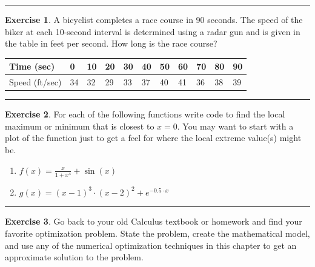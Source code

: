 \documentclass[
]{book}
\theoremstyle{definition}
\theoremstyle{definition}
\theoremstyle{definition}
\newtheorem{exercise}{Exercise}[chapter]
\theoremstyle{remark}
\begin{document}
\begin{center}\rule{0.5\linewidth}{0.5pt}\end{center}

\begin{exercise}
\protect\hypertarget{exr:unnamed-chunk-267}{}{\label{exr:unnamed-chunk-267} }A bicyclist completes a race course in 90 seconds. The speed of the
biker at each 10-second interval is determined using a radar gun and is
given in the table in feet per second. How long is the race course?

\begin{longtable}[]{@{}lllllllllll@{}}
\toprule
Time (sec) & 0 & 10 & 20 & 30 & 40 & 50 & 60 & 70 & 80 & 90\tabularnewline
\midrule
\endhead
Speed (ft/sec) & 34 & 32 & 29 & 33 & 37 & 40 & 41 & 36 & 38 & 39\tabularnewline
\bottomrule
\end{longtable}
\end{exercise}

\begin{center}\rule{0.5\linewidth}{0.5pt}\end{center}

\begin{exercise}
\protect\hypertarget{exr:unnamed-chunk-268}{}{\label{exr:unnamed-chunk-268} }For each of the following functions write code to find the local maximum
or minimum that is closest to \(x=0\). You may want to start with a plot
of the function just to get a feel for where the local extreme value(s)
might be.

\begin{enumerate}
\def\labelenumi{\alph{enumi}.}
\item
  \(\displaystyle f(x) = \frac{x}{1+x^4} + \sin(x)\)
\item
  \(\displaystyle g(x) =  \left(x-1\right)^3\cdot\left(x-2\right)^2+e^{-0.5\cdot x}\)
\end{enumerate}
\end{exercise}

\begin{center}\rule{0.5\linewidth}{0.5pt}\end{center}

\begin{exercise}
\protect\hypertarget{exr:unnamed-chunk-269}{}{\label{exr:unnamed-chunk-269} }Go back to your old Calculus textbook or homework and find your favorite
optimization problem. State the problem, create the mathematical model,
and use any of the numerical optimization techniques in this chapter to
get an approximate solution to the problem.
\end{exercise}
\end{document}
